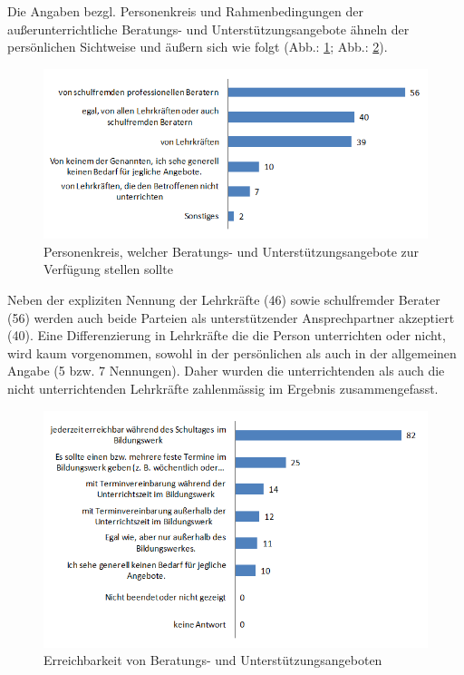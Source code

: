 Die Angaben bezgl. Personenkreis und Rahmenbedingungen der außerunterrichtliche Beratungs- und Unterstützungsangebote ähneln der persönlichen Sichtweise und äußern sich wie folgt (Abb.: \ref{fig:Personenkreis-fuer-unterstuetzungsangebote}; Abb.: \ref{fig:Erreichbarkeit-von-Beratungs-und-Unterstuetzungangeboten(2)}). 

\begin{figure}[ht]
	\centering
		\includegraphics[width=1.0\textwidth]{images/Personenkreis-fuer-unterstuetzungsangebote.png}
	\caption{Personenkreis, welcher Beratungs- und Unterstützungsangebote zur Verfügung stellen sollte}
	\label{fig:Personenkreis-fuer-unterstuetzungsangebote}
\end{figure}

\noindent
Neben der expliziten Nennung der Lehrkräfte (46) sowie schulfremder Berater (56) werden auch beide Parteien als unterstützender Ansprechpartner akzeptiert (40). Eine Differenzierung in Lehrkräfte die die Person unterrichten oder nicht, wird kaum vorgenommen, sowohl in der persönlichen als auch in der allgemeinen Angabe (5 bzw. 7 Nennungen). Daher wurden die unterrichtenden als auch die nicht unterrichtenden Lehrkräfte zahlenmässig im Ergebnis zusammengefasst.

\begin{figure}[ht]
	\centering
		\includegraphics[width=1.0\textwidth]{images/Erreichbarkeit-von-Beratungs-und-Unterstuetzungangeboten(2).png}
	\caption{Erreichbarkeit von Beratungs- und Unterstützungsangeboten}
	\label{fig:Erreichbarkeit-von-Beratungs-und-Unterstuetzungangeboten(2)}
\end{figure}

